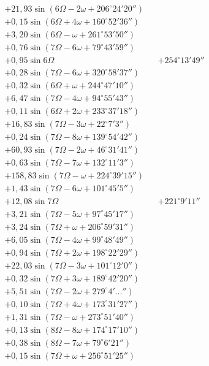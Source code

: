 \documentclass[10pt,a4paper]{article}
\begin{document}
\begin{align*}
&+ 21,93 \sin(6\Omega - 2\omega + 206^{\circ}24'20'') \\
&+ 0,15 \sin(6\Omega + 4\omega + 160^{\circ}52'36'') \\
&+ 3,20 \sin(6\Omega - \omega + 261^{\circ}53'50'') \\
&+ 0,76 \sin(7\Omega - 6\omega + 79^{\circ}43'59'') \\
&+ 0,95 \sin 6\Omega &&+ 254^{\circ}13'49'' \\
&+ 0,28 \sin(7\Omega - 6\omega + 320^{\circ}58'37'') \\
&+ 0,32 \sin(6\Omega + \omega + 244^{\circ}47'10'') \\
&+ 6,47 \sin(7\Omega - 4\omega + 94^{\circ}55'43'') \\
&+ 0,11 \sin(6\Omega + 2\omega + 233^{\circ}37'18'') \\
&+ 16,83 \sin(7\Omega - 3\omega + 22^{\circ}7'3'') \\
&+ 0,24 \sin(7\Omega - 8\omega + 139^{\circ}54'42'') \\
&+ 60,93 \sin(7\Omega - 2\omega + 46^{\circ}31'41'') \\
&+ 0,63 \sin(7\Omega - 7\omega + 132^{\circ}11'3'') \\
&+ 158,83 \sin(7\Omega - \omega + 224^{\circ}39'15'') \\
&+ 1,43 \sin(7\Omega - 6\omega + 101^{\circ}45'5'') \\
&+ 12,08 \sin 7\Omega &&+ 221^{\circ}9'11'' \\
&+ 3,21 \sin(7\Omega - 5\omega + 97^{\circ}45'17'') \\
&+ 3,24 \sin(7\Omega + \omega + 206^{\circ}59'31'') \\
&+ 6,05 \sin(7\Omega - 4\omega + 99^{\circ}48'49'') \\
&+ 0,94 \sin(7\Omega + 2\omega + 198^{\circ}22'29'') \\
&+ 22,03 \sin(7\Omega - 3\omega + 101^{\circ}12'0'') \\
&+ 0,32 \sin(7\Omega + 3\omega + 189^{\circ}42'20'') \\
&+ 5,51 \sin(7\Omega - 2\omega + 279^{\circ}4'\ldots'') \\
&+ 0,10 \sin(7\Omega + 4\omega + 173^{\circ}31'27'') \\
&+ 1,31 \sin(7\Omega - \omega + 273^{\circ}51'40'') \\
&+ 0,13 \sin(8\Omega - 8\omega + 174^{\circ}17'10'') \\
&+ 0,38 \sin(8\Omega - 7\omega + 79^{\circ}6'21'') \\
&+ 0,15 \sin(7\Omega + \omega + 256^{\circ}51'25'')
\end{align*}
\end{document}
